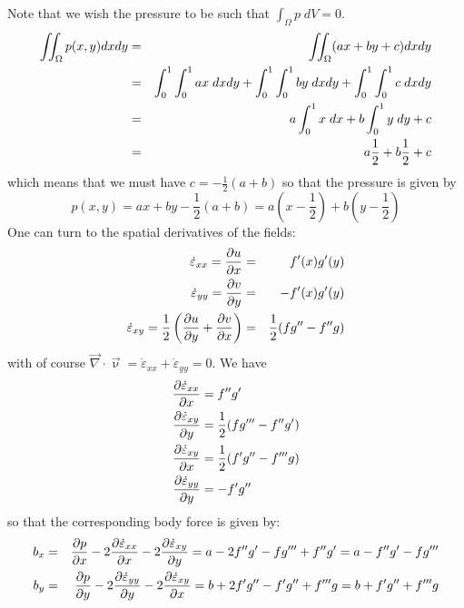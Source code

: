 Note that we wish the pressure to be such that $\int_{\Omega} p \; dV = 0$.
\begin{eqnarray}
\iint_\Omega p(x,y) dx dy 
&=& \iint_\Omega (ax+by+c) dx dy \nonumber\\
&=& \int_0^1\int_0^1 ax \; dx dy + \int_0^1\int_0^1 by \; dx dy + \int_0^1\int_0^1 c \; dx dy \nonumber\\
&=& a \int_0^1 x\; dx + b \int_0^1 y \; dy + c \nonumber\\
&=& a \frac12 + b \frac12 + c \nonumber
\end{eqnarray}
which means that we must have $c=-\frac{1}{2}(a+b)$ so that the pressure is given by
\[
p(x,y) = ax+by - \frac12(a+b) = a \left(x-\frac12\right) + b\left(y-\frac12 \right)
\]
One can turn to the spatial derivatives of the fields:
\begin{eqnarray}
\dot{\varepsilon}_{xx}=\frac{\partial u}{\partial x} &=&  f'(x) g'(y)  \nonumber\\
\dot{\varepsilon}_{yy}=\frac{\partial v}{\partial y} &=& -f'(x)g'(y)  \nonumber\\
\dot{\varepsilon}_{xy}=\frac{1}{2}\left(\frac{\partial u}{\partial y}+\frac{\partial v}{\partial x}\right) 
&=& \frac12(fg'' - f''g  ) \nonumber
\end{eqnarray}
with of course  ${\vec \nabla} \cdot {\vec \upnu} = \dot{\varepsilon}_{xx} + \dot{\varepsilon}_{yy}=0$.
We have
\begin{align}
\frac{\partial \dot{\varepsilon}_{xx}}{\partial x} &= f''g'  \nonumber\\
\frac{\partial \dot{\varepsilon}_{xy}}{\partial y} &= \frac12 (fg'''-f''g')  \nonumber\\
\frac{\partial \dot{\varepsilon}_{xy}}{\partial x} &= \frac12 (f'g''-f'''g) \nonumber\\  
\frac{\partial \dot{\varepsilon}_{yy}}{\partial y} &= -f'g'' \nonumber
\end{align}
so that the corresponding body force is given by: 
\begin{eqnarray}
b_x 
&=& \frac{\partial p}{\partial x}  
-2\frac{\partial \dot{\varepsilon}_{xx}}{\partial x} -  2\frac{\partial \dot{\varepsilon}_{xy}}{\partial y} 
= a -2f''g' -fg'''+f''g' 
= a -f''g' -fg''' \nonumber\\
b_y 
&=& \frac{\partial p}{\partial y} 
-2 \frac{\partial \dot{\varepsilon}_{yy}}{\partial y} 
-2 \frac{\partial \dot{\varepsilon}_{xy}}{\partial x} 
= b + 2f'g'' - f'g''+f'''g 
= b + f'g'' + f'''g \nonumber
\end{eqnarray}






